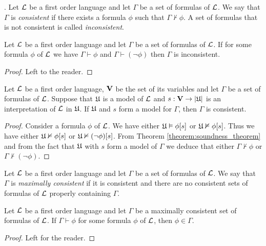\documentclass[10pt]{amsart}
\begin{document}
\begin{definition}.
	Let ${\mathcal L}$ be a first order language and let $\Gamma$ be a set of formulas of ${\mathcal L}$. We say that $\Gamma$ is \textit{consistent} if there exists a formula $\phi$ such that $\Gamma \nvdash \phi$. A set of formulas that is not consistent is called \textit{inconsistent}.
\end{definition}

\begin{proposition}\label{proposition:form_of_excluded_middle_for_consistent}
	Let ${\mathcal L}$ be a first order language and let $\Gamma$ be a set of formulas of ${\mathcal L}$. If for some formula $\phi$ of ${\mathcal L}$ we have $\Gamma \vdash \phi$ and $\Gamma \vdash (\neg \phi)$ then $\Gamma$ is inconsistent.
\end{proposition}
\begin{proof}
	Left to the reader.
\end{proof}

\begin{proposition}
	Let ${\mathcal L}$ be a first order language, $\mathbf{V}$ be the set of its variables and let $\Gamma$ be a set of formulas of ${\mathcal L}$. Suppose that ${\mathfrak U}$ is a model of ${\mathcal L}$ and $s:\mathbf{V}\rightarrow |{\mathfrak U}|$ is an interpretation of ${\mathcal L}$ in ${\mathfrak U}$. If ${\mathfrak U}$ and $s$ form a model for $\Gamma$, then $\Gamma$ is consistent.
\end{proposition}
\begin{proof}
	Consider a formula $\phi$ of ${\mathcal L}$. We have either ${\mathfrak U} \vDash \phi[s]$ or ${\mathfrak U} \nvDash \phi[s]$. Thus we have either ${\mathfrak U} \nvDash \phi[s]$ or ${\mathfrak U} \nvDash (\neg \phi)[s]$. From Theorem \ref{theorem:soundness_theorem} and from the fact that ${\mathfrak U}$ with $s$ form a model of $\Gamma$ we deduce that either $\Gamma \nvdash \phi$ or $\Gamma \nvdash (\neg \phi)$.
\end{proof}

\begin{definition}
	Let ${\mathcal L}$ be a first order language and let $\Gamma$ be a set of formulas of ${\mathcal L}$. We say that $\Gamma$ is \textit{maximally consistent} if it is consistent and there are no consistent sets of formulas of ${\mathcal L}$ properly containing $\Gamma$.
\end{definition}

\begin{proposition}
	Let ${\mathcal L}$ be a first order language and let $\Gamma$ be a maximally consistent set of formulas of ${\mathcal L}$. If $\Gamma \vdash \phi$ for some formula $\phi$ of ${\mathcal L}$, then $\phi \in \Gamma$.
\end{proposition}
\begin{proof}
	Left for the reader.
\end{proof}
\end{document}
